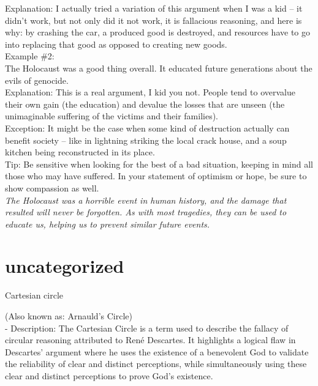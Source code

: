 \documentclass[a4paper,12pt,single,pdftex]{scrartcl}
\begin{document}
    
      Explanation: I actually tried a variation of this argument when I was a kid -- it didn’t work, but not only did it not work, it is fallacious reasoning, and here is why: by crashing the car, a produced good is destroyed, and resources have to go into replacing that good as opposed to creating new goods.
    \\

    
      Example \#2:
    \\

    
      The Holocaust was a good thing overall.  It educated future generations about the evils of genocide.
    \\

    
      Explanation: This is a real argument, I kid you not.  People tend to overvalue their own gain (the education) and devalue the losses that are unseen (the unimaginable suffering of the victims and their families). 
    \\

    
      Exception: It might be the case when some kind of destruction actually can benefit society -- like in lightning striking the local crack house, and a soup kitchen being reconstructed in its place.
    \\

    
      Tip: Be sensitive when looking for the best of a bad situation, keeping in mind all those who may have suffered. In your statement of optimism or hope, be sure to show compassion as well.
    \\

    
      {\em The Holocaust was a horrible event in human history, and the damage that resulted will never be forgotten. As with most tragedies, they can be used to educate us, helping us to prevent similar future events.}
    \\

  \section{uncategorized
  }


Cartesian circle
    
      (Also known as: Arnauld's Circle)
    \\

  
    
      - Description: The Cartesian Circle is a term used to describe the fallacy of circular reasoning attributed to René Descartes. It highlights a logical flaw in Descartes' argument where he uses the existence of a benevolent God to validate the reliability of clear and distinct perceptions, while simultaneously using these clear and distinct perceptions to prove God's existence.
    \\
\end{document}
